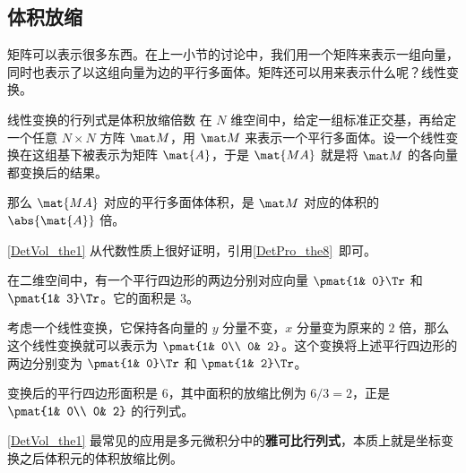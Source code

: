 


\subsection{体积放缩}

矩阵可以表示很多东西。在上一小节的讨论中，我们用一个矩阵来表示一组向量，同时也表示了以这组向量为边的平行多面体。矩阵还可以用来表示什么呢？线性变换。

\begin{theorem}{线性变换的行列式是体积放缩倍数}\label{DetVol_the1}
在 $N$ 维空间中，给定一组标准正交基，再给定一个任意 $N\times N$ 方阵 $\mat M$，用 $\mat M$ 来表示一个平行多面体。设一个线性变换在这组基下被表示为矩阵 $\mat{A}$，于是 $\mat{MA}$ 就是将 $\mat M$ 的各向量都变换后的结果。

那么 $\mat{MA}$ 对应的平行多面体体积，是 $\mat M$ 对应的体积的 $\abs{\mat{A}}$ 倍。
\end{theorem}

\autoref{DetVol_the1} 从代数性质上很好证明，引用\autoref{DetPro_the8}~即可。

\begin{example}{}
在二维空间中，有一个平行四边形的两边分别对应向量 $\pmat{1& 0}\Tr$ 和 $\pmat{1& 3}\Tr$。它的面积是 $3$。

考虑一个线性变换，它保持各向量的 $y$ 分量不变，$x$ 分量变为原来的 $2$ 倍，那么这个线性变换就可以表示为 $\pmat{1& 0\\ 0& 2}$。这个变换将上述平行四边形的两边分别变为 $\pmat{1& 0}\Tr$ 和 $\pmat{1& 2}\Tr$。

变换后的平行四边形面积是 $6$，其中面积的放缩比例为 $6/3=2$，正是 $\pmat{1& 0\\ 0& 2}$ 的行列式。
\end{example}

\autoref{DetVol_the1} 最常见的应用是多元微积分中的\textbf{雅可比行列式}，本质上就是坐标变换之后体积元的体积放缩比例。



























